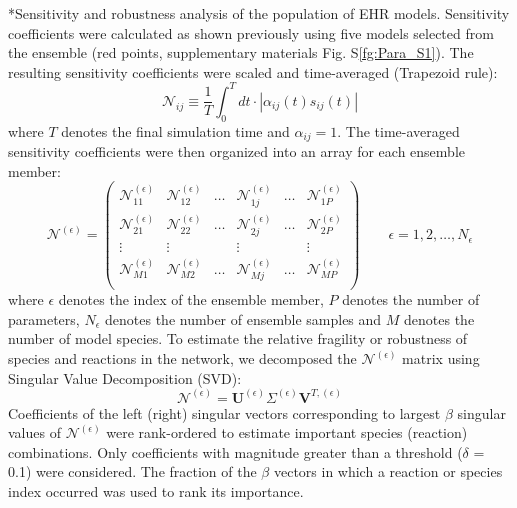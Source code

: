 \documentclass[12pt]{article}
\makeatletter
\renewcommand\subsection{\@startsection
	{subsection}{2}{0mm}
	{-0.05in}
	{-0.5\baselineskip}
	{\normalfont\normalsize\bfseries}}
\makeatother
\begin{document}
\subsection*{Sensitivity and robustness analysis of the population of EHR models.}
Sensitivity coefficients were calculated as shown previously \cite{Song:2010ij} using five models selected from the ensemble (red points, supplementary materials Fig. S\ref{fg:Para_S1}). 
The resulting sensitivity coefficients were scaled and time-averaged (Trapezoid rule):
\begin{equation}\label{eqn_INsen}
	\mathcal{N}_{ij} \equiv \frac{1}{T}\int^{T}_{0} dt \cdot |\alpha_{ij}\left(t\right)s_{ij}(t)|
\end{equation}
where $T$ denotes the final simulation time and $\alpha_{ij}=1$.
The time-averaged sensitivity coefficients were then organized into an array for each ensemble member:
\begin{equation}
	\mathcal{N}^{\left(\epsilon\right)} = 
	\begin{pmatrix}
		\mathcal{N}_{11}^{\left(\epsilon\right)} & \mathcal{N}_{12}^{\left(\epsilon\right)} & \hdots & \mathcal{N}_{1j}^{\left(\epsilon\right)} & \hdots & \mathcal{N}_{1P}^{\left(\epsilon\right)} \\
		\mathcal{N}_{21}^{\left(\epsilon\right)} & \mathcal{N}_{22}^{\left(\epsilon\right)} & \hdots & \mathcal{N}_{2j}^{\left(\epsilon\right)} & \hdots & \mathcal{N}_{2P}^{\left(\epsilon\right)} \\
		\vdots & \vdots & & \vdots & & \vdots \\
		\mathcal{N}_{M1}^{\left(\epsilon\right)} & \mathcal{N}_{M2}^{\left(\epsilon\right)} & \hdots & \mathcal{N}_{Mj}^{\left(\epsilon\right)} & \hdots & \mathcal{N}_{MP}^{\left(\epsilon\right)} \\
	\end{pmatrix}\qquad\epsilon = 1,2,\hdots,N_{\epsilon}
\end{equation}
where $\epsilon$ denotes the index of the ensemble member, $P$ denotes the number of parameters, $N_{\epsilon}$ denotes the number of ensemble samples and $M$ denotes the number of model species.
To estimate the relative fragility or robustness of species and reactions in the network, we decomposed the $\mathcal{N}^{\left(\epsilon\right)}$ matrix 
using Singular Value Decomposition (SVD):
\begin{equation}
	\mathcal{N}^{\left(\epsilon\right)} = \mathbf{U}^{\left(\epsilon\right)}\Sigma^{\left(\epsilon\right)}\mathbf{V}^{T,{\left(\epsilon\right)}}
\end{equation}
Coefficients of the left (right) singular vectors corresponding to largest $\beta$ singular values of $\mathcal{N}^{\left(\epsilon\right)}$ 
were rank-ordered to estimate important species (reaction) combinations. Only coefficients with magnitude greater than a threshold ($\delta$ = 0.1) were considered. 
The fraction of the $\beta$ vectors in which a reaction or species index occurred was used to rank its importance. 
\end{document}
